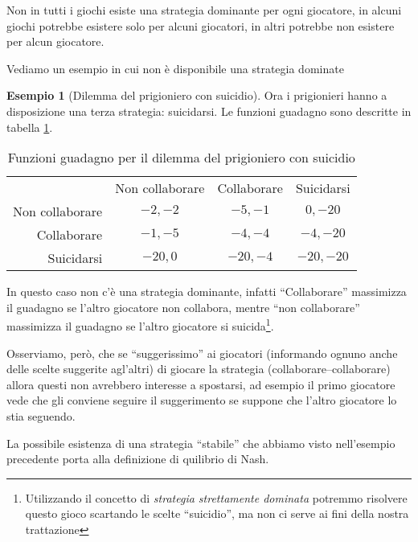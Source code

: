 \documentclass[a4paper]{article}
\theoremstyle{plain}
\theoremstyle{definition}
\newtheorem{myes}[myteo]{Esempio}
\theoremstyle{remark}
\begin{document}
Non in tutti i giochi esiste una strategia dominante per ogni
giocatore, in alcuni giochi potrebbe esistere solo per alcuni
giocatori, in altri potrebbe non esistere per alcun giocatore.

Vediamo un esempio in cui non è disponibile una strategia dominate

\begin{myes}[Dilemma del prigioniero con suicidio]
  Ora i prigionieri hanno a disposizione una terza strategia:
  suicidarsi. Le funzioni guadagno sono descritte in tabella
  \ref{tab:u1u2-prigioniero-suicidio}.
  \begin{table}[!ht]
    \centering
    \begin{tabular}{rccc}
      & Non collaborare & Collaborare & Suicidarsi \\
      \cline{2-4}
      Non collaborare & \multicolumn{1}{|c|}{$-2,-2$} & \multicolumn{1}{|c|}{$-5,-1$} & \multicolumn{1}{|c|}{$0,-20$}  \\
      \cline{2-4}
      Collaborare & \multicolumn{1}{|c|}{$-1,-5$} & \multicolumn{1}{|c|}{$-4,-4$}  & \multicolumn{1}{|c|}{$-4,-20$} \\
      \cline{2-4}
      Suicidarsi & \multicolumn{1}{|c|}{$-20,0$} & \multicolumn{1}{|c|}{$-20,-4$}  & \multicolumn{1}{|c|}{$-20,-20$} \\
      \cline{2-4}
    \end{tabular}
    \caption{Funzioni guadagno per il dilemma del prigioniero con
      suicidio}
    \label{tab:u1u2-prigioniero-suicidio}
  \end{table}

  In questo caso non c'è una strategia dominante, infatti
  ``Collaborare'' massimizza il guadagno se l'altro giocatore non
  collabora, mentre ``non collaborare'' massimizza il guadagno se
  l'altro giocatore si suicida\footnote{Utilizzando il concetto di
    \textit{strategia strettamente dominata} potremmo risolvere questo
    gioco scartando le scelte ``suicidio'', ma non ci serve ai fini
    della nostra trattazione}.

  Osserviamo, però, che se ``suggerissimo'' ai giocatori (informando
  ognuno anche delle scelte suggerite agl'altri) di giocare la
  strategia (collaborare--collaborare) allora questi non avrebbero
  interesse a spostarsi, ad esempio il primo giocatore vede che gli
  conviene seguire il suggerimento se suppone che l'altro giocatore lo
  stia seguendo.
\end{myes}

La possibile esistenza di una strategia ``stabile'' che abbiamo visto
nell'esempio precedente porta alla definizione di quilibrio di Nash.
\end{document}
